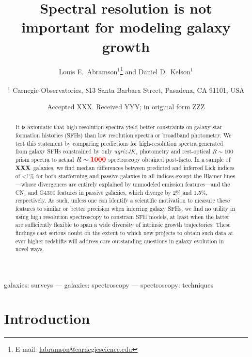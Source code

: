 \documentclass[a4paper,fleqn,usenatbib]{mnras}
\title[Who needs spectra?]{Spectral resolution is not important for modeling galaxy growth}
\author[Abramson \& Kelson]{Louis E.~Abramson$^{1}$\thanks{E-mail: \href{mailto:labramson@carnegiescience.edu}{labramson@carnegiescience.edu}} and Daniel D.~Kelson$^{1}$
\\
\\
$^1$	Carnegie Observatories, 813 Santa Barbara Street, Pasadena, CA 91101, USA\\
}
\date{Accepted XXX. Received YYY; in original form ZZZ}
\newcommand{\resp}{respectively}
\newcommand{\bfr}{\bf\color{red}}
\newcommand{\ntot}{{\bfr XXX}} %
\begin{document}
\label{firstpage}
\pagerange{\pageref{firstpage}--\pageref{lastpage}}
\maketitle

\begin{abstract}

	It is axiomatic that high resolution spectra yield better constraints on galaxy star formation
	histories (SFHs) than low resolution spectra or broadband photometry. We test this statement 
	by comparing predictions for high-resolution spectra generated from galaxy SFHs constrained
	by only $ugrizJK_{s}$ photometry and rest-optical	$R\sim100$ prism spectra to actual 
	$R\sim{\bfr 1000}$ spectroscopy obtained post-facto. In a sample of \ntot\ galaxies, we find 
	median differences between predicted and inferred Lick indices of <1\% for both starforming
	and passive galaxies in all indices except the Blamer lines---whose divergences are entirely 
	explained by unmodeled emission features---and the CN$_{1}$ and G4300 features in passive 
	galaxies, which diverge by 2\% and 1.5\%, \resp. As such, unless one can identify a scientific
	motivation to measure these features to similar or better precision when inferring galaxy SFHs,
	we find no utility in using high resolution spectroscopy to constrain SFH models, at least when
	the latter are sufficiently flexible to span a wide diversity of intrinsic growth trajectories. These
	findings cast serious doubt on the extent to which new projects to obtain such data at ever higher 
	redshifts will address core outstanding questions in galaxy evolution in novel ways.

\end{abstract}

\begin{keywords}
	galaxies: surveys --- galaxies: spectroscopy --- spectroscopy: techniques
\end{keywords}



\section{Introduction}
\label{sec:intro}
\end{document}
